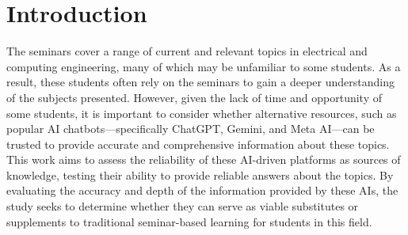 \section{Introduction}

The seminars cover a range of current and relevant topics in electrical and computing engineering, many of which may be 
unfamiliar to some students. As a result, these students often rely on the seminars to gain a deeper understanding of the 
subjects presented. However, given the lack of time and opportunity of some students, it is important to
consider whether alternative resources, such as popular AI chatbots—specifically ChatGPT, Gemini, and Meta AI—can be trusted
to provide accurate and comprehensive information about these topics. This work aims to assess the reliability
of these AI-driven platforms as sources of knowledge, testing their ability to provide reliable answers about the topics.
By evaluating the accuracy and depth of the information provided by these AIs, the study seeks to determine whether they
can serve as viable substitutes or supplements to traditional seminar-based learning for students in this field.
\pagebreak